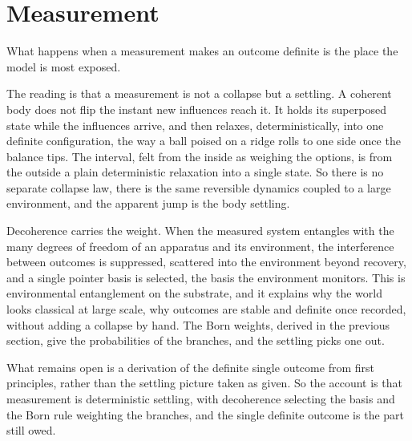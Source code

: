 \section{Measurement}

What happens when a measurement makes an outcome definite is the place the model is most exposed.

The reading is that a measurement is not a collapse but a settling. A coherent body does not flip the instant new
influences reach it. It holds its superposed state while the influences arrive, and then relaxes, deterministically,
into one definite configuration, the way a ball poised on a ridge rolls to one side once the balance tips. The interval,
felt from the inside as weighing the options, is from the outside a plain deterministic relaxation into a single state.
So there is no separate collapse law, there is the same reversible dynamics coupled to a large environment, and the
apparent jump is the body settling.

Decoherence carries the weight. When the measured system entangles with the many degrees of freedom of an apparatus and
its environment, the interference between outcomes is suppressed, scattered into the environment beyond recovery, and a
single pointer basis is selected, the basis the environment monitors. This is environmental entanglement on the
substrate, and it explains why the world looks classical at large scale, why outcomes are stable and definite once
recorded, without adding a collapse by hand. The Born weights, derived in the previous section, give the probabilities
of the branches, and the settling picks one out.

What remains open is a derivation of the definite single outcome from first principles, rather than
the settling picture taken as given. So the account is that measurement is deterministic
settling, with decoherence selecting the basis and the Born rule weighting the branches, and the single definite outcome
is the part still owed.
